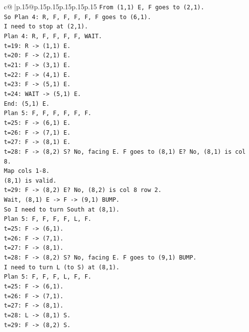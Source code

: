 \documentclass{article}
\begin{document}
{\begin{supertabular}{c@{$\;$}|p{.15\linewidth}@{}p{.15\linewidth}p{.15\linewidth}p{.15\linewidth}p{.15\linewidth}p{.15\linewidth}}
{{{\texttt{From (1,1) E, F goes to (2,1).} \\
\texttt{So Plan 4: R, F, F, F, F, F goes to (6,1).} \\
\texttt{I need to stop at (2,1).} \\
\texttt{Plan 4: R, F, F, F, F, WAIT.} \\
\texttt{t=19: R {-}> (1,1) E.} \\
\texttt{t=20: F {-}> (2,1) E.} \\
\texttt{t=21: F {-}> (3,1) E.} \\
\texttt{t=22: F {-}> (4,1) E.} \\
\texttt{t=23: F {-}> (5,1) E.} \\
\texttt{t=24: WAIT {-}> (5,1) E.} \\
\texttt{End: (5,1) E.} \\
\texttt{Plan 5: F, F, F, F, F, F.} \\
\texttt{t=25: F {-}> (6,1) E.} \\
\texttt{t=26: F {-}> (7,1) E.} \\
\texttt{t=27: F {-}> (8,1) E.} \\
\texttt{t=28: F {-}> (8,2) S? No, facing E. F goes to (8,1) E? No, (8,1) is col 8.} \\
\texttt{Map cols 1{-}8.} \\
\texttt{(8,1) is valid.} \\
\texttt{t=29: F {-}> (8,2) E? No, (8,2) is col 8 row 2.} \\
\texttt{Wait, (8,1) E {-}> F {-}> (9,1) BUMP.} \\
\texttt{So I need to turn South at (8,1).} \\
\texttt{Plan 5: F, F, F, F, L, F.} \\
\texttt{t=25: F {-}> (6,1).} \\
\texttt{t=26: F {-}> (7,1).} \\
\texttt{t=27: F {-}> (8,1).} \\
\texttt{t=28: F {-}> (8,2) S? No, facing E. F goes to (9,1) BUMP.} \\
\texttt{I need to turn L (to S) at (8,1).} \\
\texttt{Plan 5: F, F, F, L, F, F.} \\
\texttt{t=25: F {-}> (6,1).} \\
\texttt{t=26: F {-}> (7,1).} \\
\texttt{t=27: F {-}> (8,1).} \\
\texttt{t=28: L {-}> (8,1) S.} \\
\texttt{t=29: F {-}> (8,2) S.} \\
}}}
\end{supertabular}}
\end{document}
